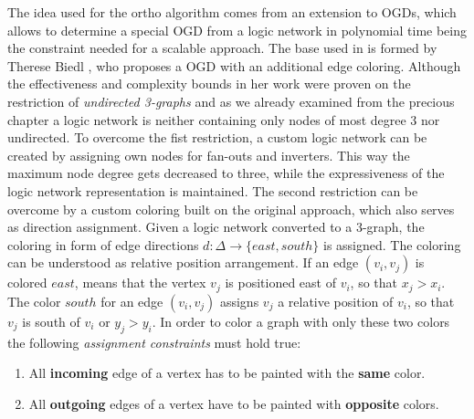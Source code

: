The idea used for the ortho algorithm comes from an extension to OGDs, which allows to determine a special OGD from a logic network in polynomial time being the constraint needed for a scalable approach. The base used in \cite{ortho} is formed by Therese Biedl \cite{biedl1998better}, who proposes a OGD with an additional edge coloring. Although the effectiveness and complexity bounds in her work were proven on the restriction of \textit{undirected 3-graphs} and as we already examined from the precious chapter a logic network is neither containing only nodes of most degree 3 nor undirected. To overcome the fist restriction, a custom logic network can be created by assigning own nodes for fan-outs and inverters. This way the maximum node degree gets decreased to three, while the expressiveness of the logic network representation is maintained. The second restriction can be overcome by a custom coloring built on the original approach, which also serves as direction assignment. Given a logic network converted to a 3-graph, the coloring in form of edge directions $d : \Delta \rightarrow \{east, south\}$ is assigned. The coloring can be understood as relative position arrangement. If an edge $(v_i, v_j)$ is colored $east$, means that the vertex $v_j$ is positioned east of $v_i$, so that $x_j > x_i$. The color $south$ for an edge $(v_i, v_j)$ assigns $v_j$ a relative position of $v_i$, so that $v_j$ is south of $v_i$ or $y_j > y_i$. In order to color a graph with only these two colors the following \textit{assignment constraints} must hold true:

\begin{enumerate}
	\item All \textbf{incoming} edge of a vertex has to be painted with the \textbf{same} color.
	\item All \textbf{outgoing} edges of a vertex have to be painted with \textbf{opposite} colors.
\end{enumerate}

